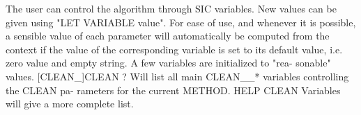 The  user  can  control  the algorithm through SIC variables. New
values can be given using "LET VARIABLE value". For ease of  use,
and  whenever  it is possible, a sensible value of each parameter
will automatically be computed from the context if the  value  of
the corresponding variable is set to its default value, i.e. zero
value and empty string. A few variables are initialized to  "rea-
sonable" values.
    [CLEAN_]CLEAN ?
Will  list  all main CLEAN__* variables controlling the CLEAN pa-
rameters for the current METHOD.
HELP CLEAN Variables will give a more complete list.
